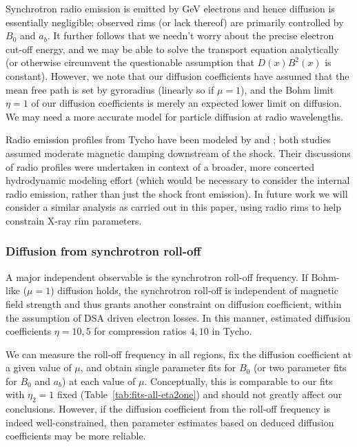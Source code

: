 \documentclass[iop, apj, numberedappendix]{emulateapj}
\begin{document}
Synchrotron radio emission is emitted by GeV electrons and hence diffusion
is essentially negligible; observed rims (or lack thereof) are primarily
controlled by $B_0$ and $a_b$.  It further follows that we needn't worry about
the precise electron cut-off energy, and we may be able to solve the transport
equation analytically (or otherwise circumvent the questionable assumption that
$D(x) B^2(x)$ is constant).  However, we note that our diffusion coefficients
have assumed that the mean free path is set by gyroradius (linearly so if
$\mu = 1$), and the Bohm limit $\eta = 1$ of our diffusion coefficients is
merely an expected lower limit on diffusion.  We may need a more accurate model
for particle diffusion at radio wavelengths.

Radio emission profiles from Tycho have been modeled by
\citet{cassam-chenai2007} and \citet{morlino2012}; both studies assumed
moderate magnetic damping downstream of the shock.  Their discussions of radio
profiles were undertaken in context of a broader, more concerted hydrodynamic
modeling effort (which would be necessary to consider the internal radio
emission, rather than just the shock front emission).  In future work we will
consider a similar analysis as carried out in this paper, using radio rims to
help constrain X-ray rim parameters.

\subsubsection{Diffusion from synchrotron roll-off}

A major independent observable is the synchrotron roll-off frequency.  If
Bohm-like ($\mu = 1$) diffusion holds, the synchrotron roll-off is independent
of magnetic field strength and thus grants another constraint on diffusion
coefficient, within the assumption of DSA driven electron losses.  In this
manner, \citet{parizot2006} estimated diffusion coefficients $\eta = 10, 5$ for
compression ratios $4, 10$ in Tycho.

We can measure the roll-off frequency in all regions, fix the diffusion
coefficient at a given value of $\mu$, and obtain single parameter fits for
$B_0$ (or two parameter fits for $B_0$ and $a_b$) at each value of $\mu$.
Conceptually, this is comparable to our fits with $\eta_2 = 1$ fixed
(Table~\ref{tab:fits-all-eta2one}) and should not greatly affect our
conclusions.  However, if the diffusion coefficient from the roll-off frequency
is indeed well-constrained, then parameter estimates based on deduced diffusion
coefficients may be more reliable.
\end{document}

